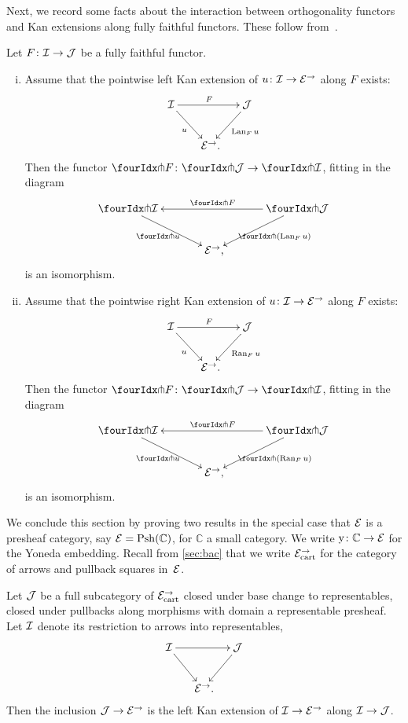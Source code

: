 \documentclass[reqno,10pt,a4paper,oneside,draft]{amsart}
\begin{document}
{{%

Next, we record some facts about the interaction between orthogonality functors and Kan extensions along fully faithful functors.
These follow  from~\cite[Lemma~24]{bourke-garner-I}.

\begin{proposition} \label{kan-extension-closure}
Let $F \co \cal{I} \to \cal{J}$ be a fully faithful functor.
\begin{enumerate}[(i)]
\item Assume that the pointwise left Kan extension of $u \co \cal{I} \to \catE^\to$ along $F$ exists:
\[
\xymatrix@!C@C-1em{
  \cal{I}
  \ar[dr]_{u}
  \ar[rr]^{F}
&&
  \cal{J}
  \ar[dl]^{\Lan_F u}
\\&
  \catE^\to
\rlap{.}}
\]
Then the functor $\liftr{F} \co \liftr{\cal{J}} \to \liftr{\cal{I}}$, fitting in the diagram
\[
\xymatrix@!C@C-1em{
  \liftr{\cal{I}}
  \ar[dr]_{\liftr{u}}
&&
  \liftr{\cal{J}}
  \ar[ll]_{\liftr{F}}
  \ar[dl]^{\liftr{(\Lan_F u)}}
\\&
  \catE^\to
\rlap{,}}
\]
is an isomorphism.
\item Assume that the pointwise right Kan extension of $u \co \cal{I} \to \catE^\to$ along $F$ exists:
\[
\xymatrix@!C@C-1em{
  \cal{I}
  \ar[dr]_{u}
  \ar[rr]^{F}
&&
  \cal{J}
  \ar[dl]^{\Ran_F u}
\\&
  \catE^\to
\rlap{.}}
\]
Then the functor $\liftl{F} \co \liftl{\cal{J}} \to \liftl{\cal{I}}$, fitting in the diagram
\[
\xymatrix@!C@C-1em{
  \liftl{\cal{I}}
  \ar[dr]_{\liftl{u}}
&&
  \liftl{\cal{J}}
  \ar[ll]_{\liftl{F}}
  \ar[dl]^{\liftl{(\Ran_F u)}}
\\&
  \catE^\to
\rlap{,}}
\]
is an isomorphism.
\end{enumerate}
\end{proposition}

We conclude this section by  proving two results in the special case that $\catE$ is a presheaf category, say $\cal{E} = \Psh(\mathbb{C})$, for $\mathbb{C}$ a small category.
We write $\yon \co \mathbb{C} \to \cal{E}$ for the Yoneda embedding.
Recall from \cref{sec:bac} that we write $\catE_{\cart}^\to$ for the category of arrows and pullback squares in~$\cal{E}$.

\begin{lemma} \label{left-kan-extension-of-representables}
Let $\cal{J}$ be a full subcategory of $\catE_{\cart}^\to$ closed under base change to representables, \ie closed under pullbacks along morphisms with domain a representable presheaf.
Let $\cal{I}$ denote its restriction to arrows into representables,
\[
\xymatrix@C-1em{
  \cal{I}
  \ar[rr]
  \ar[dr]
&&
  \cal{J}
  \ar[dl]
\\&
  \catE^\to \rlap{.} 
}
\]
Then the inclusion $\cal{J} \to \catE^\to$ is the left Kan extension of $\cal{I} \to \catE^\to$ along $\cal{I} \to \cal{J}$.
\end{lemma}

}}
\end{document}
